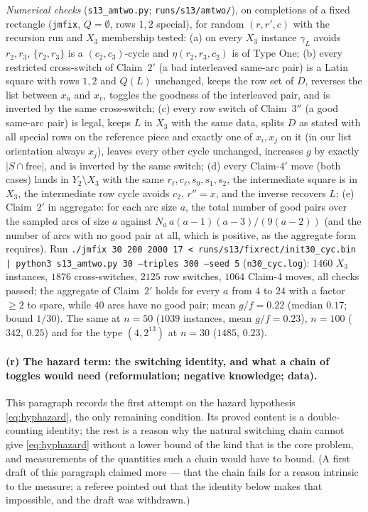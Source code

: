 \emph{Numerical checks} (\texttt{s13\_amtwo.py};
\texttt{runs/s13/amtwo/}), on completions of a fixed rectangle
(\texttt{jmfix}, $Q=\emptyset$, rows $1,2$ special), for random
$(r,r',c)$ with the recursion run and $X_3$ membership tested:
(a) on every $X_3$ instance $\gamma_L$ avoids $r_2,r_3$, $\{r_2,r_3\}$
is a $(c_2,c_3)$-cycle and $\eta(r_2,r_3,c_2)$ is of Type One;
(b) every restricted cross-switch of Claim~$2'$ (a bad interleaved
same-arc pair) is a Latin square with rows $1,2$ and $Q(L)$ unchanged,
keeps the row set of $D$, reverses the list between $x_u$ and $x_v$,
toggles the goodness of the interleaved pair, and is inverted by the
same cross-switch; (c) every row switch of Claim~$3''$ (a good same-arc
pair) is legal, keeps $L$ in $X_3$ with the same data, splits $D$ as
stated with all special rows on the reference piece and exactly one of
$x_i,x_j$ on it (in our list orientation always $x_j$), leaves every
other cycle unchanged, increases $g$ by exactly $|S\cap\text{free}|$,
and is inverted by the same switch; (d) every Claim-$4'$ move (both
cases) lands in $Y_2\setminus X_3$ with the same
$r_\ell,c_\ell,s_0,s_1,s_2$, the intermediate square is in $X_3$, the
intermediate row cycle avoids $c_2$, $r''=x$, and the inverse recovers
$L$; (e) Claim~$2'$ in aggregate: for each arc size $a$, the total
number of good pairs over the sampled arcs of size $a$ against
$N_a\,a(a-1)(a-3)/(9(a-2))$ (and the number of arcs with no good pair
at all, which is positive, as the aggregate form requires).  Run
\texttt{./jmfix 30 200 2000 17 < runs/s13/fixrect/init30\_cyc.bin | python3 s13\_amtwo.py 30 --triples 300 --seed 5}
(\texttt{n30\_cyc.log}): $1460$ $X_3$ instances, $1876$ cross-switches,
$2125$ row switches, $1064$ Claim-4 moves, all checks passed; the
aggregate of Claim~$2'$ holds for every $a$ from $4$ to $24$ with a
factor $\ge2$ to spare, while $40$ arcs have no good pair; mean
$g/f=0.22$ (median $0.17$; bound $1/30$).  The same at $n=50$ ($1039$
instances, mean $g/f=0.23$), $n=100$ ($342$, $0.25$) and for the type
$(4,2^{13})$ at $n=30$ ($1485$, $0.23$).

\paragraph{(r) The hazard term: the switching identity, and what a
chain of toggles would need (reformulation; negative knowledge; data).}
This paragraph records the first attempt on the hazard hypothesis
\eqref{eq:hyphazard}, the only remaining condition.  Its proved content
is a double-counting identity; the rest is a reason why the natural
switching chain cannot give \eqref{eq:hyphazard} without a lower bound
of the kind that is the core problem, and measurements of the
quantities such a chain would have to bound.  (A first draft of this
paragraph claimed more --- that the chain fails for a reason intrinsic
to the measure; a referee pointed out that the identity below makes
that impossible, and the draft was withdrawn.)

